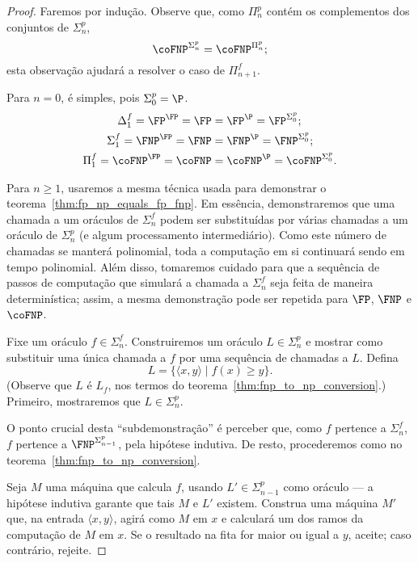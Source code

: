 \begin{proof}
    Faremos por indução.
    Observe que,
    como $\Pi_n^p$ contém os complementos dos conjuntos de $\Sigma_n^p$,
    \begin{equation*}
        \coFNP^{\Sigma_n^p} = \coFNP^{\Pi_n^p};
    \end{equation*}
    esta observação ajudará a resolver o caso de $\Pi_{n+1}^f$.

    Para $n = 0$, é simples, pois $\Sigma_0^p = \P$.
    \begin{align*}
        \Delta_1^f = \FP^\FP = \FP &= \FP^\P = \FP^{\Sigma_0^p}; \\
        \Sigma_1^f = \FNP^\FP = \FNP &= \FNP^\P = \FNP^{\Sigma_0^p}; \\
        \Pi_1^f = \coFNP^\FP = \coFNP &= \coFNP^\P = \coFNP^{\Sigma_0^p}.
    \end{align*}

    Para $n \geq 1$, usaremos a mesma técnica usada
    para demonstrar o teorema~\ref{thm:fp_np_equals_fp_fnp}.
    Em essência,
    demonstraremos que uma chamada a um oráculos de $\Sigma_n^f$
    podem ser substituídas por várias chamadas a um oráculo de $\Sigma_n^p$
    (e algum processamento intermediário).
    Como este número de chamadas se manterá polinomial,
    toda a computação em si continuará sendo em tempo polinomial.
    Além disso,
    tomaremos cuidado para que a sequência de passos de computação
    que simulará a chamada a $\Sigma_n^f$
    seja feita de maneira determinística;
    assim,
    a mesma demonstração pode ser repetida para $\FP$, $\FNP$ e $\coFNP$.

    Fixe um oráculo $f \in \Sigma_n^f$.
    Construiremos um oráculo $L \in \Sigma_n^p$
    e mostrar como substituir uma única chamada a $f$
    por uma sequência de chamadas a $L$.
    Defina
    \begin{equation*}
        L = \{\langle x, y\rangle \mid f(x) \geq y\}.
    \end{equation*}
    (Observe que $L$ é $L_f$, nos termos do teorema~\ref{thm:fnp_to_np_conversion}.)
    Primeiro, mostraremos que $L \in \Sigma_n^p$.

    O ponto crucial desta ``subdemonstração'' é perceber que,
    como $f$ pertence a $\Sigma_n^f$,
    $f$ pertence a $\FNP^{\Sigma_{n-1}^p}$,
    pela hipótese indutiva.
    De resto, procederemos como no teorema~\ref{thm:fnp_to_np_conversion}.

    Seja $M$ uma máquina que calcula $f$,
    usando $L' \in \Sigma_{n-1}^p$ como oráculo
    --- a hipótese indutiva garante que tais $M$ e $L'$ existem.
    Construa uma máquina $M'$ que,
    na entrada $\langle x, y \rangle$,
    agirá como $M$ em $x$ e calculará um dos ramos da computação de $M$ em $x$.
    Se o resultado na fita for maior ou igual a $y$,
    aceite;
    caso contrário, rejeite.


\end{proof}
